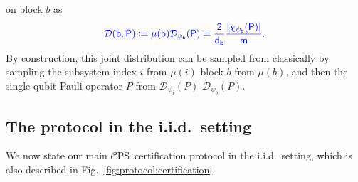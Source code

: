 \documentclass[a4paper,twocolumn,11pt,unpublished]{../../revision/quantumarticle}
\newcommand{\np}{m}
\newcommand{\CEPS}{$\mathcal C$PS}
\newcommand{\pdist}{\mathcal D} %
\providecommand{\DIFadd}[1]{{\protect\color{blue} \sf #1}} %
\providecommand{\DIFdel}[1]{{\protect\color{red} \scriptsize #1}} %
\providecommand{\DIFaddbegin}{} %
\providecommand{\DIFaddend}{} %
\providecommand{\DIFdelbegin}{} %
\providecommand{\DIFdelend}{} %
\begin{document}
\DIFdelend \DIFaddbegin \DIFadd{on block $b$ as
             }\begin{equation}
            \DIFadd{\label{DpsiPi}
                \pdist(b, P) \coloneqq \mu(b)\pdist_{\psi_b}(P)=\frac{2}{d_b}\frac{|\chi_{\psi_b}(P)|}{\np}.
            }\end{equation}\DIFaddend 
            By construction, this joint distribution can be sampled from classically by sampling the \DIFdelbegin \DIFdel{subsystem index $i$ from $\mu(i)$}\DIFdelend \DIFaddbegin \DIFadd{block $b$ from $\mu(b)$}\DIFaddend , and then the \DIFdelbegin \DIFdel{single-qubit }\DIFdelend Pauli operator $P$ from \DIFdelbegin \DIFdel{$\mathcal{D}_{\psi_i}(P)$}\DIFdelend \DIFaddbegin \DIFadd{$\mathcal{D}_{\psi_b}(P)$}\DIFaddend .



            
\subsection{The protocol in the i.i.d.\ setting}
\label{subsection:iid}
%
%
%
%
%


 
            We now state our main \CEPS\ certification protocol in the i.i.d.\ setting, which is also described in Fig.~\ref{fig:protocol:certification}.


        
\end{document}
